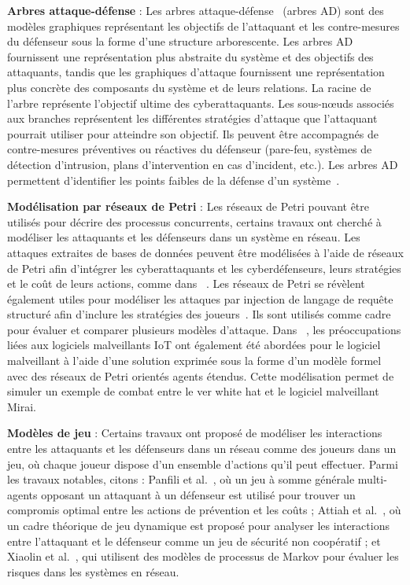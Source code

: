 

\noindent
\textbf{Arbres attaque-défense} : \quad Les arbres attaque-défense~\cite{BKordy2010} (arbres AD) sont des modèles graphiques représentant les objectifs de l'attaquant et les contre-mesures du défenseur sous la forme d'une structure arborescente. Les arbres AD fournissent une représentation plus abstraite du système et des objectifs des attaquants, tandis que les graphiques d'attaque fournissent une représentation plus concrète des composants du système et de leurs relations. La racine de l'arbre représente l'objectif ultime des cyberattaquants. Les sous-nœuds associés aux branches représentent les différentes stratégies d'attaque que l'attaquant pourrait utiliser pour atteindre son objectif. Ils peuvent être accompagnés de contre-mesures préventives ou réactives du défenseur (pare-feu, systèmes de détection d'intrusion, plans d'intervention en cas d'incident, etc.).
Les arbres AD permettent d'identifier les points faibles de la défense d'un système~\cite{BKordy2010}.


\noindent
\textbf{Modélisation par réseaux de Petri} : \quad Les réseaux de Petri pouvant être utilisés pour décrire des processus concurrents, certains travaux ont cherché à modéliser les attaquants et les défenseurs dans un système en réseau.
Les attaques extraites de bases de données peuvent être modélisées à l'aide de réseaux de Petri afin d'intégrer les cyberattaquants et les cyberdéfenseurs, leurs stratégies et le coût de leurs actions, comme dans ~\cite{MPetty2022}. Les réseaux de Petri se révèlent également utiles pour modéliser les attaques par injection de langage de requête structuré afin d'inclure les stratégies des joueurs~\cite{JBland2020}.
Ils sont utilisés comme cadre pour évaluer et comparer plusieurs modèles d'attaque.
Dans ~\cite{SYamaguchi2020}, les préoccupations liées aux logiciels malveillants IoT ont également été abordées pour le logiciel malveillant  à l'aide d'une solution  exprimée sous la forme d'un modèle formel avec des réseaux de Petri orientés agents étendus. Cette modélisation permet de simuler un exemple de combat entre le ver white hat et le logiciel malveillant Mirai.


\noindent
\textbf{Modèles de jeu} : \quad Certains travaux ont proposé de modéliser les interactions entre les attaquants et les défenseurs dans un réseau comme des joueurs dans un jeu, où chaque joueur dispose d'un ensemble d'actions qu'il peut effectuer.
Parmi les travaux notables, citons : Panfili et al.~\cite{MPanfili2018}, où un jeu à somme générale multi-agents opposant un attaquant à un défenseur est utilisé pour trouver un compromis optimal entre les actions de prévention et les coûts ; Attiah et al.~\cite{AAttiah2018}, où un cadre théorique de jeu dynamique est proposé pour analyser les interactions entre l'attaquant et le défenseur comme un jeu de sécurité non coopératif ; et Xiaolin et al.~\cite{CXiaolin2008}, qui utilisent des modèles de processus de Markov pour évaluer les risques dans les systèmes en réseau.

